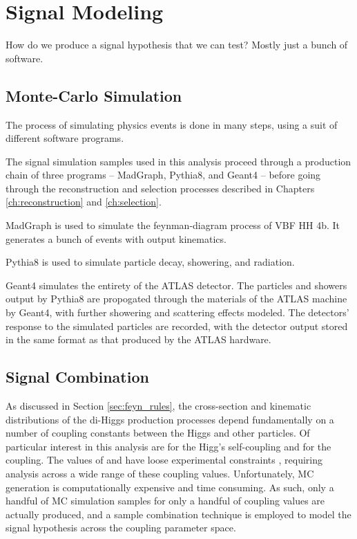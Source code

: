 \chapter{Signal Modeling}

How do we produce a signal hypothesis that we can test?
Mostly just a bunch of software.

\section{Monte-Carlo Simulation} \label{sec:mcsim}

    The process of simulating physics events is done in many steps, using a suit of different software programs.

    The signal simulation samples used in this analysis proceed through a production chain of three programs
        -- MadGraph, Pythia8, and Geant4 -- before going through the reconstruction and selection processes described in Chapters \ref{ch:reconstruction} and \ref{ch:selection}.

    MadGraph is used to simulate the feynman-diagram process of VBF \to HH \to 4b.
    It generates a bunch of events with output kinematics.

    Pythia8 is used to simulate particle decay, showering, and radiation.

    Geant4 simulates the entirety of the ATLAS detector.
    The particles and showers output by Pythia8 are propogated through the materials of the ATLAS machine by Geant4,
        with further showering and scattering effects modeled.
    The detectors' response to the simulated particles are recorded, with the detector output stored in the same format as that produced by the ATLAS hardware.

\section{Signal Combination}

    As discussed in Section \ref{sec:feyn_rules}, the cross-section and kinematic distributions of the di-Higgs production processes depend fundamentally on a number of coupling constants between the Higgs and other particles.
    Of particular interest in this analysis are \kl for the Higg's self-coupling and \kvv for the \HHVV coupling.
    The values of \kl and \kvv have loose experimental constraints \cite{EXOT-2016-31} \cite{HDBS-2018-18-witherratum} \cite{ATLAS-CONF-2019-049},
        requiring analysis across a wide range of these coupling values.
    Unfortunately, MC generation is computationally expensive and time consuming.
    As such, only a handful of MC simulation samples for only a handful of coupling values are actually produced,
        and a sample combination technique is employed to model the signal hypothesis across the coupling parameter space.

